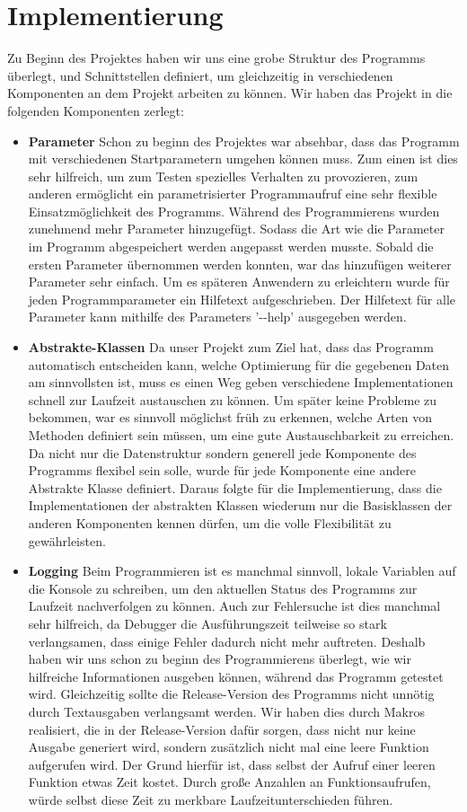 \documentclass[
	12pt,
	a4paper,
	BCOR10mm,
	DIV14,
	headsepline,
]{scrreprt}
\begin{document}
\section{Implementierung}
Zu Beginn des Projektes haben wir uns eine grobe Struktur des Programms überlegt, und Schnittstellen definiert, um gleichzeitig in verschiedenen Komponenten an dem Projekt arbeiten zu können. Wir haben das Projekt in die folgenden Komponenten zerlegt:

\begin{itemize}
	\item \textbf{Parameter} Schon zu beginn des Projektes war absehbar, dass das Programm mit verschiedenen Startparametern umgehen können muss. Zum einen ist dies sehr hilfreich, um zum Testen spezielles Verhalten zu provozieren, zum anderen ermöglicht ein parametrisierter Programmaufruf eine sehr flexible Einsatzmöglichkeit des Programms. Während des Programmierens wurden zunehmend mehr Parameter hinzugefügt. Sodass die Art wie die Parameter im Programm abgespeichert werden angepasst werden musste. Sobald die ersten Parameter übernommen werden konnten, war das hinzufügen weiterer Parameter sehr einfach. Um es späteren Anwendern zu erleichtern wurde für jeden Programmparameter ein Hilfetext aufgeschrieben. Der Hilfetext für alle Parameter kann mithilfe des Parameters '-{}-help' ausgegeben werden.
	\item \textbf{Abstrakte-Klassen} Da unser Projekt zum Ziel hat, dass das Programm automatisch entscheiden kann, welche Optimierung für die gegebenen Daten am sinnvollsten ist, muss es einen Weg geben verschiedene Implementationen schnell zur Laufzeit austauschen zu können. Um später keine Probleme zu bekommen, war es sinnvoll möglichst früh zu erkennen, welche Arten von Methoden definiert sein müssen, um eine gute Austauschbarkeit zu erreichen. Da nicht nur die Datenstruktur sondern generell jede Komponente des Programms flexibel sein solle, wurde für jede Komponente eine andere Abstrakte Klasse definiert. Daraus folgte für die Implementierung, dass die Implementationen der abstrakten Klassen wiederum nur die Basisklassen der anderen Komponenten kennen dürfen, um die volle Flexibilität zu gewährleisten.
	\item \textbf{Logging} Beim Programmieren ist es manchmal sinnvoll, lokale Variablen auf die Konsole zu schreiben, um den aktuellen Status des Programms zur Laufzeit nachverfolgen zu können. Auch zur Fehlersuche ist dies manchmal sehr hilfreich, da Debugger die Ausführungszeit teilweise so stark verlangsamen, dass einige Fehler dadurch nicht mehr auftreten. Deshalb haben wir uns schon zu beginn des Programmierens überlegt, wie wir hilfreiche Informationen ausgeben können, während das Programm getestet wird. Gleichzeitig sollte die Release-Version des Programms nicht unnötig durch Textausgaben verlangsamt werden. Wir haben dies durch Makros realisiert, die in der Release-Version dafür sorgen, dass nicht nur keine Ausgabe generiert wird, sondern zusätzlich nicht mal eine leere Funktion aufgerufen wird. Der Grund hierfür ist, dass selbst der Aufruf einer leeren Funktion etwas Zeit kostet. Durch große Anzahlen an Funktionsaufrufen, würde selbst diese Zeit zu merkbare Laufzeitunterschieden führen.

\end{itemize}
\end{document}
